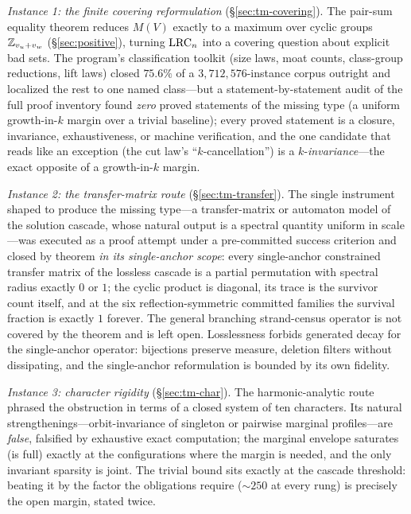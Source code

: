 \emph{Instance 1: the finite covering reformulation}
(\S\ref{sec:tm-covering}). The pair-sum equality theorem reduces
$M(V)$ exactly to a maximum over cyclic groups $\mathbb{Z}_{v_u+v_w}$
(\S\ref{sec:positive}), turning $\mathrm{LRC}_n$ into a covering question about
explicit bad sets. The program's classification toolkit (size laws, moat
counts, class-group reductions, lift laws) closed $75.6\%$ of a
$3{,}712{,}576$-instance corpus outright and localized the rest to one
named class---but a statement-by-statement audit of the full proof
inventory found \emph{zero} proved statements of the missing type (a
uniform growth-in-$k$ margin over a trivial baseline); every proved
statement is a closure, invariance, exhaustiveness, or machine
verification, and the one candidate that reads like an exception (the cut
law's ``$k$-cancellation'') is a $k$-\emph{invariance}---the exact
opposite of a growth-in-$k$ margin.

\emph{Instance 2: the transfer-matrix route} (\S\ref{sec:tm-transfer}).
The single instrument shaped to produce the missing type---a
transfer-matrix or automaton model of the solution cascade, whose natural
output is a spectral quantity uniform in scale---was executed as a proof
attempt under a pre-committed success criterion and closed by theorem
\emph{in its single-anchor scope}: every single-anchor constrained
transfer matrix of the lossless cascade is a partial
permutation with spectral radius exactly $0$ or $1$; the cyclic product is
diagonal, its trace is the survivor count itself, and at the six
reflection-symmetric committed families the survival fraction is exactly
$1$ forever. The general branching strand-census operator is not covered
by the theorem and is left open. Losslessness forbids generated decay
for the single-anchor operator: bijections preserve
measure, deletion filters without dissipating, and the single-anchor
reformulation is bounded by its own fidelity.

\emph{Instance 3: character rigidity} (\S\ref{sec:tm-char}). The
harmonic-analytic route phrased the obstruction in terms of a closed
system of ten characters. Its natural strengthenings---orbit-invariance
of singleton or pairwise marginal profiles---are \emph{false}, falsified
by exhaustive exact computation; the marginal envelope saturates (is
full) exactly at the configurations where the margin is needed, and the
only invariant sparsity is joint. The trivial bound sits exactly at the
cascade threshold: beating it by the factor the obligations require
($\sim\!250$ at every rung) is precisely the open margin, stated twice.

